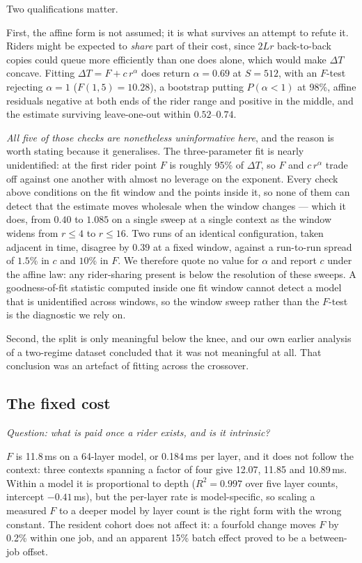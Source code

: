 Two qualifications matter.

First, the affine form is not assumed; it is what survives an attempt to
refute it. Riders might be expected to \emph{share} part of their cost, since
$2 L r$ back-to-back copies could queue more efficiently than one does alone,
which would make $\Delta T$ concave. Fitting $\Delta T = F + c\,r^{\alpha}$ does
return $\alpha = 0.69$ at $S{=}512$, with an $F$-test rejecting $\alpha{=}1$
($F(1,5) = 10.28$), a bootstrap putting $P(\alpha<1)$ at 98\%, affine residuals
negative at both ends of the rider range and positive in the middle, and the
estimate surviving leave-one-out within $0.52$--$0.74$.

\emph{All five of those checks are nonetheless uninformative here}, and the
reason is worth stating because it generalises. The three-parameter fit is
nearly unidentified: at the first rider point $F$ is roughly 95\% of
$\Delta T$, so $F$ and $c\,r^{\alpha}$ trade off against one another with
almost no leverage on the exponent. Every check above conditions on the fit
window and the points inside it, so none of them can detect that the estimate
moves wholesale when the window changes --- which it does, from $0.40$ to
$1.085$ on a single sweep at a single context as the window widens from
$r \le 4$ to $r \le 16$. Two runs of an identical configuration, taken
adjacent in time, disagree by $0.39$ at a fixed window, against a run-to-run
spread of $1.5$\% in $c$ and $10$\% in $F$.
We therefore quote no value for $\alpha$ and report $c$ under the affine law:
any rider-sharing present is below the resolution of these sweeps. A
goodness-of-fit statistic computed inside one fit window cannot detect a model
that is unidentified across windows, so the window sweep rather than the
$F$-test is the diagnostic we rely on.

Second, the split is only meaningful below the knee, and our own earlier
analysis of a two-regime dataset concluded that it was not meaningful at all.
That conclusion was an artefact of fitting across the crossover.

\subsection{The fixed cost}
\label{sec:overhead:F}

\emph{Question: what is paid once a rider exists, and is it intrinsic?}

$F$ is 11.8\,ms on a 64-layer model, or 0.184\,ms per layer, and it does not
follow the context: three contexts spanning a factor of four give 12.07, 11.85
and 10.89\,ms.
Within a model it is proportional to depth ($R^2 = 0.997$ over five layer
counts, intercept $-0.41$\,ms), but the per-layer rate is model-specific, so
scaling a measured $F$ to a deeper model by layer count is the right form with
the wrong constant.
The resident cohort does not affect it: a fourfold change moves $F$ by 0.2\%
within one job, and an apparent 15\% batch effect proved to be a
between-job offset.

